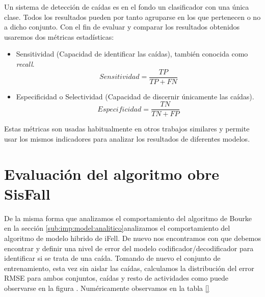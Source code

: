 

Un sistema de detección de caídas es en el fondo un clasificador con una única clase. Todos los resultados pueden por tanto agruparse en los que pertenecen o no a dicho conjunto. Con el fin de evaluar y comparar los resultados obtenidos usaremos dos métricas estadísticas:
\begin{itemize}
  \item Sensitividad (Capacidad de identificar las caídas), también conocida como \textit{recall}.
  \[
    Sensitividad = \frac{TP}{TP+FN}
  \]
  \item Especificidad o Selectividad (Capacidad de discernir únicamente las caídas).
  \[
    Especificidad = \frac{TN}{TN+FP}
  \]
\end{itemize}

Estas métricas son usadas habitualmente en otros trabajos similares\cite{Noury2007,Chen2005, Bourke2006} y permite usar los mismos indicadores para analizar los resultados de diferentes modelos.

\section{Evaluación del algoritmo obre SisFall}\label{sec:eval:hibrido}

De la misma forma que analizamos el comportamiento del algoritmo de Bourke en la sección \ref{sub:imp:model:analitico}analizamos el comportamiento del algoritmo de modelo hibrido de iFell. De nuevo nos encontramos con que debemos encontrar y definir una nivel de error del modelo codificador/decodificador para identificar si se trata de una caída. Tomando de nuevo el conjunto de entrenamiento, esta vez sin aislar las caídas, calculamos la distribución del error RMSE para ambos conjuntos, caídas y resto de actividades como puede observarse en la figura . Numéricamente observamos en la tabla \ref{}


